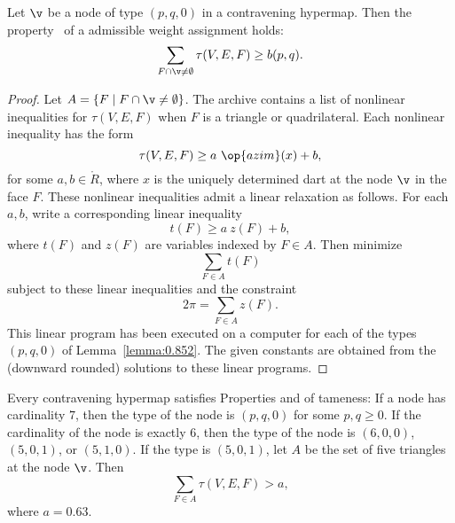 \begin{lemma}[] \label{lemma:weightB}
  Let $\v$ be a node of type $(p,q,0)$ in a contravening hypermap.
  Then the property~ of a admissible weight assignment
  holds:
\begin{displaymath}
\sum_{ F\cap \v\ne \emptyset} \tau(V,E,F) \ge  b(p,q).
\end{displaymath}
\end{lemma}
%
%

\begin{proof} Let $A =\{F\mid F\cap \v\ne\emptyset\}$.  The archive
  \cite[FUSDSPJ]{hales:2009:nonlinear} contains a list of nonlinear
  inequalities for $\tau(V,E,F)$ when $F$ is a triangle or
  quadrilateral. Each nonlinear inequality has the form
\begin{displaymath}\tau(V,E,F) \ge a~\op{azim}(x) + b,\end{displaymath}
for some $a,b\in\ring{R}$, where $x$ is the uniquely determined dart
at the node $\v$ in the face $F$.  These nonlinear inequalities admit
a linear relaxation as follows.  For each $a,b$, write a corresponding
linear inequality %
%
\begin{displaymath}
t(F) \ge a~z(F) + b,
\end{displaymath}
where $t(F)$ and $z(F)$ are variables indexed by $F\in A$.
%
%
%
Then  minimize 
\begin{displaymath}\sum_{F\in A} t(F)\end{displaymath}
subject to these linear inequalities and the constraint
\begin{displaymath}
2\pi = \sum_{F\in A} z(F).
\end{displaymath}
This linear program has been executed on a computer for each of the
types $(p,q,0)$ of Lemma~\ref{lemma:0.852}. The given constants are
obtained from the (downward rounded) solutions to these linear
programs.
\end{proof}

\begin{lemma}[]\label{lemma:degE}
  Every contravening hypermap satisfies Properties 
  and 
of tameness: 
If a node has cardinality $7$, then the type of the
node is $(p,q,0)$ for some $p,q\ge0$.   If the
cardinality of the node is exactly $6$, then the type of the node
is $(6,0,0)$, $(5,0,1)$, or $(5,1,0)$.
If the type is $(5,0,1)$, let $A$ be the set of five triangles at the
node $\v$.  Then
%
\begin{displaymath}
\sum_{F\in A} \tau(V,E,F) > a,
\end{displaymath}
where $a=0.63$.
\end{lemma}



